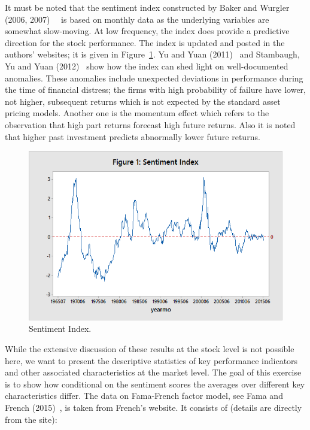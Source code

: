  
 It must be noted that the sentiment index constructed by Baker and Wurgler (2006, 2007)~\cite{baker2006investor}~\cite{baker2007investor} is based on monthly data as the underlying variables are somewhat slow-moving. At low frequency, the index does provide a predictive direction for the stock performance. The index is updated and posted in the authors' websites; it is given in Figure~\ref{fig:sentimentindex}. Yu and Yuan (2011)~\cite{yuyuan} and Stambaugh, Yu and Yuan (2012)~\cite{stamb} show how the index can shed light on well-documented anomalies. These anomalies include unexpected deviations in performance during the time of financial distress; the firms with high probability of failure have lower, not higher, subsequent returns which is not expected by the standard asset pricing models. Another one is the momentum effect which refers to the observation that high part returns forecast high future returns. Also it is noted that higher past investment predicts abnormally lower future returns. 
	 \begin{figure}[!ht]
	\centering
	\includegraphics[width=\textwidth]{chapters/chapter_news_an/figures/ch4sec1sentimentindex.png}
	\caption{Sentiment Index.\label{fig:sentimentindex}}
	\end{figure}

While the extensive discussion of these results at the stock level is not possible here, we want to present the descriptive statistics of key performance indicators and other associated characteristics at the market level. The goal of this exercise is to show how conditional on the sentiment scores the averages over different key characteristics differ. The data on Fama-French factor model, see Fama and French (2015)~\cite{fama2015international}, is taken from French's website. It consists of (details are directly from the site):


